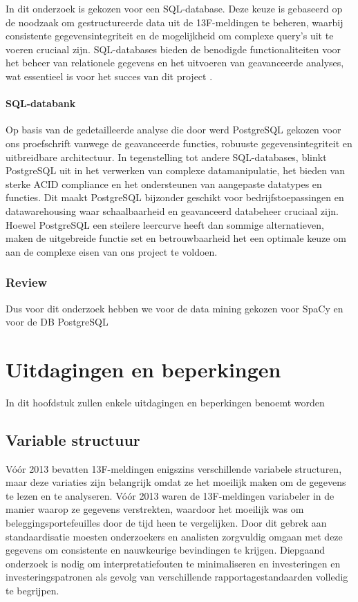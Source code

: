 In dit onderzoek is gekozen voor een SQL-database. Deze keuze is gebaseerd op de noodzaak om gestructureerde data uit de 13F-meldingen te beheren, waarbij consistente gegevensintegriteit en de mogelijkheid om complexe query’s uit te voeren cruciaal zijn. SQL-databases bieden de benodigde functionaliteiten voor het beheer van relationele gegevens en het uitvoeren van geavanceerde analyses, wat essentieel is voor het succes van dit project \autocite{khan2023performance}.

\paragraph{SQL-databank}
Op basis van de gedetailleerde analyse die door \autocite{Javija2024} werd PostgreSQL gekozen voor ons proefschrift vanwege de geavanceerde functies, robuuste gegevensintegriteit en uitbreidbare architectuur. In tegenstelling tot andere SQL-databases, blinkt PostgreSQL uit in het verwerken van complexe datamanipulatie, het bieden van sterke ACID compliance en het ondersteunen van aangepaste datatypes en functies. Dit maakt PostgreSQL bijzonder geschikt voor bedrijfstoepassingen en datawarehousing waar schaalbaarheid en geavanceerd databeheer cruciaal zijn. Hoewel PostgreSQL een steilere leercurve heeft dan sommige alternatieven, maken de uitgebreide functie set en betrouwbaarheid het een optimale keuze om aan de complexe eisen van ons project te voldoen.

\subsubsection{Review}
Dus voor dit onderzoek hebben we voor de data mining gekozen voor SpaCy en voor de DB PostgreSQL








\section{Uitdagingen en beperkingen}
In dit hoofdstuk zullen enkele uitdagingen en beperkingen benoemt worden
\subsection{Variable structuur}
Vóór 2013 bevatten 13F-meldingen enigszins verschillende variabele structuren, maar deze variaties zijn belangrijk omdat ze het moeilijk maken om de gegevens te lezen en te analyseren. Vóór 2013 waren de 13F-meldingen variabeler in de manier waarop ze gegevens verstrekten, waardoor het moeilijk was om beleggingsportefeuilles door de tijd heen te vergelijken. Door dit gebrek aan standaardisatie moesten onderzoekers en analisten zorgvuldig omgaan met deze gegevens om consistente en nauwkeurige bevindingen te krijgen. Diepgaand onderzoek is nodig om interpretatiefouten te minimaliseren en investeringen en investeringspatronen als gevolg van verschillende rapportagestandaarden volledig te begrijpen.
